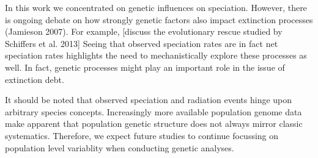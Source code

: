 \documentclass[a4paper]{scrartcl}
\begin{document}
In this work we concentrated on genetic influences on speciation.
However, there is ongoing debate on how strongly genetic factors also impact extinction processes (Jamieson 2007).
For example, [discuss the evolutionary rescue studied by Schiffers et al. 2013]
Seeing that observed speciation rates are in fact net speciation rates highlights the need to mechanistically explore
these processes as well.
In fact, genetic processes might play an important role in the issue of extinction debt. %

It should be noted that observed speciation and radiation events hinge upon arbitrary species concepts.
Increasingly more available population genome data make apparent that population genetic structure does not
always mirror classic systematics.
Therefore, we expect future studies to continue focussing on population level variablity when conducting genetic analyses.
\printbibliography
\end{document}
